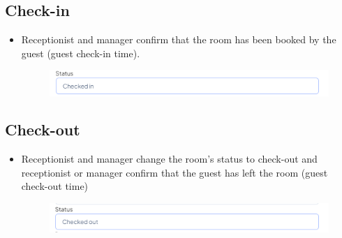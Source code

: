     \subsection{Check-in}
    \begin{itemize}
        \item Receptionist and manager confirm that the room has been booked by the guest (guest check-in time). 
        \begin{figure}[H]
            \includegraphics[width=1\linewidth]{img/checkin.png}
            \label{fig:checkin}
        \end{figure}
    \end{itemize}
    \subsection{Check-out}
    \begin{itemize}
        \item Receptionist and manager change the room's status to check-out and receptionist or manager confirm that the guest has left the room (guest check-out time)
        \begin{figure}[H]
            \includegraphics[width=1\linewidth]{img/checkout.png}
            \label{fig:checkout}
        \end{figure}
    \end{itemize}
